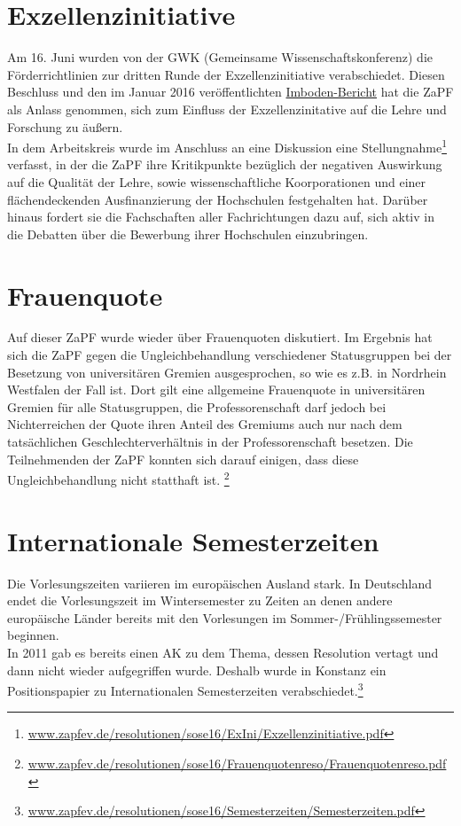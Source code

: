 \section*{Exzellenzinitiative}
Am 16. Juni wurden von der GWK (Gemeinsame Wissenschaftskonferenz) die 
Förderrichtlinien zur dritten Runde der Exzellenzinitiative verabschiedet. 
Diesen Beschluss und den im Januar 2016 veröffentlichten 
\href{http://www.gwk-bonn.de/fileadmin/Papers/Imboden-Bericht-2016.pdf}{Imboden-Bericht}
 hat die ZaPF als Anlass genommen, sich zum Einfluss der Exzellenzinitative auf 
die Lehre und Forschung zu äußern. \\
In dem Arbeitskreis wurde im Anschluss an eine Diskussion eine 
Stellungnahme\footnote{\href{http://www.zapfev.de/resolutionen/sose16/ExIni/Exzellenzinitiative.pdf}{\url{www.zapfev.de/resolutionen/sose16/ExIni/Exzellenzinitiative.pdf}}}
 verfasst, in der die ZaPF ihre Kritikpunkte bezüglich der negativen Auswirkung 
auf die Qualität der Lehre, sowie wissenschaftliche Koorporationen und einer 
flächendeckenden Ausfinanzierung der Hochschulen festgehalten hat. Darüber 
hinaus fordert sie die Fachschaften aller Fachrichtungen dazu auf, sich aktiv 
in die Debatten über die Bewerbung ihrer Hochschulen einzubringen. 

\section*{Frauenquote}
Auf dieser ZaPF wurde wieder über Frauenquoten diskutiert. Im Ergebnis hat sich 
die ZaPF gegen die Ungleichbehandlung verschiedener Statusgruppen bei der 
Besetzung von universitären Gremien ausgesprochen, so wie es z.B. in Nordrhein 
Westfalen der Fall ist. Dort gilt eine allgemeine Frauenquote in universitären 
Gremien für alle Statusgruppen, die Professorenschaft darf jedoch bei 
Nichterreichen der Quote ihren Anteil des Gremiums auch nur nach dem 
tatsächlichen Geschlechterverhältnis in der Professorenschaft besetzen. Die 
Teilnehmenden der ZaPF konnten sich darauf einigen, dass diese 
Ungleichbehandlung nicht statthaft ist. 
\footnote{\href{http://www.zapfev.de/resolutionen/sose16/Frauenquotenreso/Frauenquotenreso.pdf}{\url{www.zapfev.de/resolutionen/sose16/Frauenquotenreso/Frauenquotenreso.pdf}}}


\section*{Internationale Semesterzeiten}
Die Vorlesungszeiten variieren im europäischen Ausland stark. In Deutschland 
endet die Vorlesungszeit im Wintersemester zu Zeiten an denen andere 
europäische Länder bereits mit den Vorlesungen im Sommer-/Frühlingssemester 
beginnen. \\
In 2011 gab es bereits einen AK zu dem Thema, dessen Resolution vertagt und 
dann nicht wieder aufgegriffen wurde. Deshalb wurde in Konstanz ein 
Positionspapier zu Internationalen Semesterzeiten 
verabschiedet.\footnote{\href{http://www.zapfev.de/resolutionen/sose16/Semesterzeiten/Semesterzeiten.pdf}{\url{www.zapfev.de/resolutionen/sose16/Semesterzeiten/Semesterzeiten.pdf}}}

